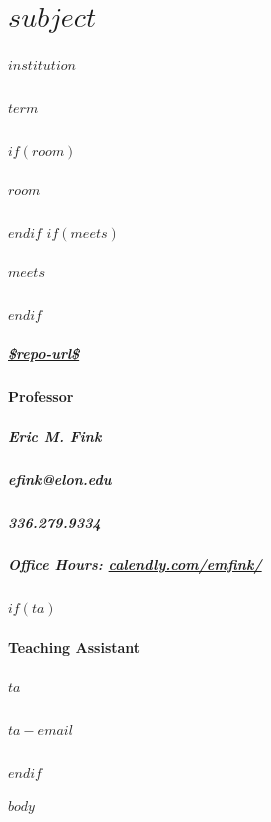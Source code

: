 \documentclass[11pt,letterpaper,twoside]{article}
\begin{document}
\thispagestyle{empty}

\color{OffBlack}

\section{$subject$}

\begin{footnotesize}
\subparagraph{$institution$}
\subparagraph{$term$}
$if(room)$\subparagraph{$room$}$endif$
$if(meets)$\subparagraph{$meets$}$endif$
\subparagraph{\url{$repo-url$}}
\vspace{1em}

\paragraph{Professor}
\subparagraph{Eric M. Fink} 
\subparagraph{efink@elon.edu}
\subparagraph{336.279.9334} 
\subparagraph{Office Hours: {\url{calendly.com/emfink/}}}
$if(ta)$
\vspace{1em}
\paragraph{Teaching Assistant}
\subparagraph{$ta$}
\subparagraph{$ta-email$}
$endif$
\end{footnotesize}

\vspace{1em}


$body$
\end{document}
